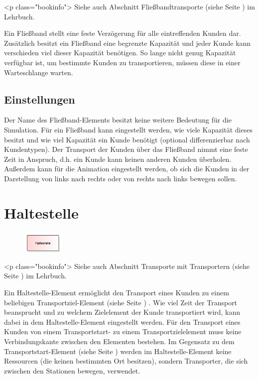 <p class="bookinfo">
Siehe auch Abschnitt Fließbandtransporte (siehe Seite \pageref{ref:book:8.3.4}) im Lehrbuch.

Ein Fließband stellt eine feste Verzögerung für alle eintreffenden Kunden dar.
Zusätzlich besitzt ein Fließband eine begrenzte Kapazität und jeder Kunde
kann verschieden viel dieser Kapazität benötigen. So lange nicht genug
Kapazität verfügbar ist, um bestimmte Kunden zu transportieren, müssen diese
in einer Warteschlange warten.

\subsection*{Einstellungen}

Der Name des Fließband-Elements besitzt keine weitere Bedeutung
für die Simulation. Für ein Fließband kann eingestellt werden,
wie viele Kapazität dieses besitzt und wie viel Kapazität ein
Kunde benötigt (optional differenzierbar nach Kundentypen). Der
Transport der Kunden über das Fließband nimmt eine feste Zeit in
Anspruch, d.h. ein Kunde kann keinen anderen Kunden überholen.
Außerdem kann für die Animation eingestellt werden, ob sich die
Kunden in der Darstellung von links nach rechts oder von rechts
nach links bewegen sollen.


\section{Haltestelle}
\label{ref:ModelElementTransportTransporterSource}

\begin{figure}
\vspace{-22pt}
\includegraphics[width=2cm]{imageModelElementTransportTransporterSource.png}
\vspace{-22pt}
\end{figure}

<p class="bookinfo">
Siehe auch Abschnitt Transporte mit Transportern (siehe Seite \pageref{ref:book:8.3.2}) im Lehrbuch.

Ein Haltestelle-Element ermöglicht den Transport eines Kunden zu einem beliebigen
Transportziel-Element (siehe Seite \pageref{ref:ModelElementTransportDestination}) . Wie viel
Zeit der Transport beansprucht und zu welchem Zielelement der Kunde transportiert
wird, kann dabei in dem Haltestelle-Element eingestellt werden.
Für den Transport eines Kunden von einem Transportstart- zu einem Transportzielelement
muss keine Verbindungskante zwischen den Elementen bestehen.
Im Gegensatz zu dem Transportstart-Element (siehe Seite \pageref{ref:ModelElementTransportSource}) 
werden im Haltestelle-Element keine Ressourcen (die keinen bestimmten Ort besitzen),
sondern Transporter, die sich zwischen den Stationen bewegen, verwendet.

